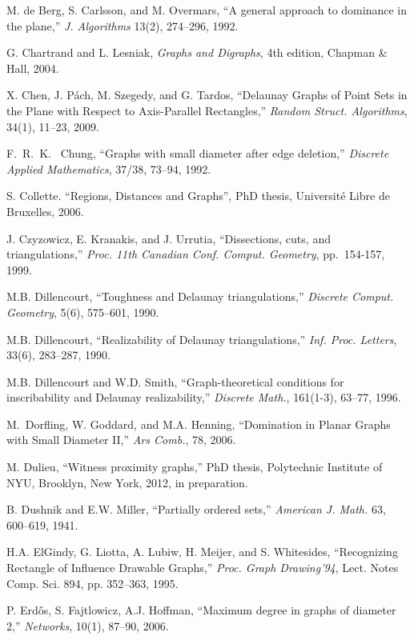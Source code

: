 \documentclass{llncs}
\begin{document}
\begin{thebibliography}{99}
  M. de Berg, S. Carlsson, and M. Overmars,
``A general approach to dominance in the plane,''
\emph{J. Algorithms} 13(2), 274--296, 1992.

 G. Chartrand and L. Lesniak,
\emph{Graphs and Digraphs}, 4th edition, Chapman \& Hall, 2004.

 X. Chen, J. P\'ach, M. Szegedy, and G. Tardos,
``Delaunay Graphs of Point Sets in the Plane with Respect to Axis-Parallel Rectangles,''
\emph{Random Struct. Algorithms},
34(1), 11--23, 2009.


 F.~R.~K.~ Chung,
``Graphs with small diameter after edge deletion,''
\emph{Discrete Applied Mathematics},
37/38, 73--94, 1992.


 S. Collette. ``Regions, Distances and Graphs'', PhD thesis, Universit\'{e} Libre de Bruxelles, 2006.

  J. Czyzowicz, E. Kranakis, and J. Urrutia,
``Dissections, cuts, and triangulations,''
\emph{Proc. 11th Canadian Conf. Comput. Geometry},
pp.~154-157, 1999.

 M.B. Dillencourt,
``Toughness and Delaunay triangulations,''
\emph{Discrete Comput. Geometry}, 5(6), 575--601, 1990.

 M.B. Dillencourt,
``Realizability of Delaunay triangulations,''
\emph{Inf. Proc. Letters}, 33(6), 283--287, 1990.

 M.B. Dillencourt and W.D. Smith,
``Graph-theoretical conditions for inscribability and Delaunay
realizability,''
\emph{Discrete Math.}, 161(1-3), 63--77, 1996.

 M.~Dorfling, W. Goddard, and M.A. Henning,
``Domination in Planar Graphs with Small Diameter II,''
\emph{Ars Comb.},
78, 2006.

 M. Dulieu, ``Witness proximity graphs,'' PhD thesis, Polytechnic Institute of
  NYU, Brooklyn, New York, 2012, in preparation.

  B. Dushnik and E.W. Miller,
``Partially ordered sets,''
\emph{American J. Math.} 63, 600--619, 1941.

 H.A. ElGindy, G. Liotta, A. Lubiw, H. Meijer, and S. Whitesides,
``Recognizing Rectangle of Influence Drawable Graphs,''
\emph{Proc. Graph Drawing'94}, Lect. Notes Comp. Sci. 894, 
pp. 352--363, 1995.

 P. Erd\H{o}s, S. Fajtlowicz, A.J. Hoffman,
``Maximum degree in graphs of diameter 2,''
\emph{Networks}, 10(1), 87--90, 2006.


\end{thebibliography}
\end{document}

